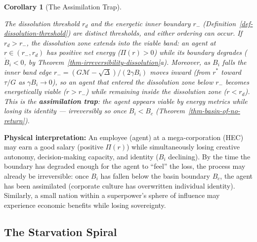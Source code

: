 \documentclass[11pt]{article}
\theoremstyle{plain}
\newtheorem{corollary}[theorem]{Corollary}
\theoremstyle{definition}
\theoremstyle{remark}
\let\origsubsection\subsection
\renewcommand{\subsection}{\needspace{7\baselineskip}\origsubsection}
\begin{document}
\begin{corollary}[The Assimilation Trap]
\label{cor-assimilation-trap}

The dissolution threshold $r_d$ and the energetic inner boundary $r_-$ (Definition~\ref{def-dissolution-threshold}) are distinct thresholds, and either ordering can occur. If $r_d > r_-$, the dissolution zone extends into the viable band: an agent at $r \in (r_-, r_d)$ has positive net energy ($\Pi(r) > 0$) while its boundary degrades ($\dot{B}_i < 0$, by Theorem~\ref{thm-irreversibility-dissolution}a). Moreover, as $B_i$ falls the inner band edge $r_- = (G\mathcal{M} - \sqrt{\Delta})/(2\gamma B_i)$ moves inward (from $r^*$ toward $\tau/G$ as $\gamma B_i \to 0$), so an agent that entered the dissolution zone below $r_-$ becomes energetically viable ($r > r_-$) while remaining inside the dissolution zone ($r < r_d$). This is the \textbf{assimilation trap}: the agent appears viable by energy metrics while losing its identity — irreversibly so once $B_i < B_c$ (Theorem~\ref{thm-basin-of-no-return}).
\end{corollary}

\textbf{Physical interpretation:} An employee (agent) at a
mega-corporation (HEC) may earn a good salary (positive \(\Pi(r)\))
while simultaneously losing creative autonomy, decision-making capacity,
and identity (\(B_i\) declining). By the time the boundary has degraded
enough for the agent to ``feel'' the loss, the process may already be
irreversible: once \(B_i\) has fallen below the basin boundary \(B_c\),
the agent has been assimilated (corporate culture has overwritten
individual identity). Similarly, a small nation within a superpower's
sphere of influence may experience economic benefits while losing
sovereignty.

\subsection{The Starvation Spiral}\label{the-starvation-spiral}
\end{document}

